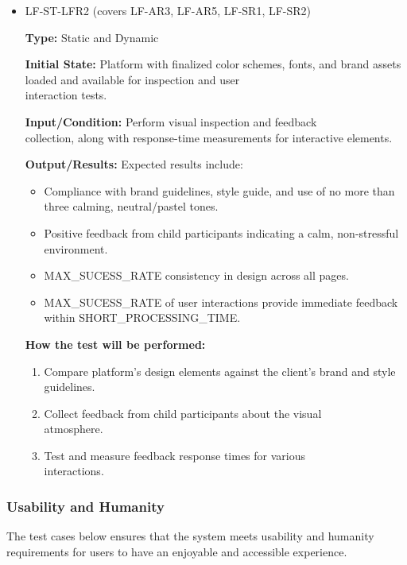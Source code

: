 \documentclass[12pt, titlepage]{article}
\begin{document}
\begin{itemize}
  \item LF-ST-LFR2 (covers LF-AR3, LF-AR5, LF-SR1, LF-SR2)
  \begin{mdframed}[linewidth=0.5mm] 
    \textbf{Type:} Static and Dynamic \par 
    \textbf{Initial State:} Platform with finalized color schemes, fonts, and brand assets loaded and available for inspection and user \\interaction tests. \par 
    \textbf{Input/Condition:} Perform visual inspection and feedback \\collection, along with response-time measurements for interactive elements. \par 
    \textbf{Output/Results:} Expected results include: 
    \begin{itemize} 
      \item Compliance with brand guidelines, style guide, and use of no more than three calming, neutral/pastel tones. 
      \item Positive feedback from child participants indicating a calm, non-stressful environment. 
      \item MAX\_SUCESS\_RATE consistency in design across all pages. 
      \item MAX\_SUCESS\_RATE of user interactions provide immediate feedback within SHORT\_PROCESSING\_TIME. 
    \end{itemize} \par 
    \textbf{How the test will be performed:} 
    \begin{enumerate}[noitemsep] 
      \item Compare platform’s design elements against the client’s brand and style guidelines. 
      \item Collect feedback from child participants about the visual \\atmosphere. 
      \item Test and measure feedback response times for various \\interactions. 
    \end{enumerate} 
  \end{mdframed} 
\end{itemize}

\subsubsection{Usability and Humanity}
\hspace{2em}The test cases below ensures that the system meets usability and humanity
requirements for users to have an enjoyable and accessible experience.
\end{document}
